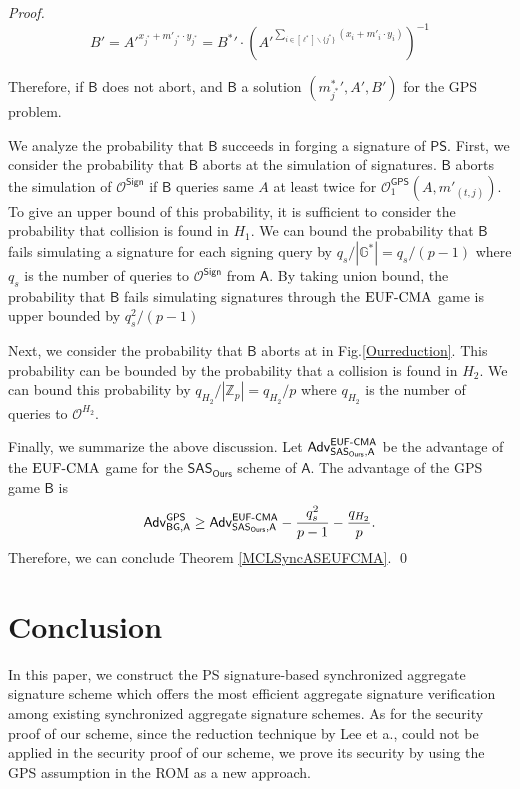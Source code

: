 \documentclass[a4paper,11pt]{fullverllncs}
\newcommand{\A}{\mathsf{A}}
\newcommand{\B}{\mathsf{B}}
\newcommand{\Adv}{\mathsf{Adv}}
\newcommand{\Z}{\mathbb{Z}}
\newcommand{\G}{\mathbb{G}}
\newcommand{\BG}{\mathsf{BG}}
\newcommand{\Ours}{\mathsf{Ours}}
\newcommand{\Sign}{\mathsf{Sign}}
\newcommand{\EUFCMA}{\mathsf{EUF \mathchar`- CMA}}
\newcommand{\rmEUFCMA}{\mathrm{EUF}\mathchar`-\mathrm{CMA}}
\newcommand{\PS}{\mathsf{PS}}
\newcommand{\GPS}{\mathsf{GPS}}
\newcommand{\SAS}{\mathsf{SAS}}
\begin{document}
\begin{proof}
\begin{equation*}
B' =  A'{}^{x_{j^*} + m'_{j^*} \cdot y_{j^*}}  = B^*{}' \cdot \left(A'{}^{\sum_{i \in [\ell^*]\backslash \{j^*\}} (x_i + m'_{i} \cdot y_{i})} \right)^{-1}
\end{equation*}

Therefore, if $\B$ does not abort,  and $\B$ a solution $(m^*_{j^*}{}', A'{}, B' )$ for the GPS problem.



We analyze the probability that $\B$ succeeds in forging a signature of $\PS$.
First, we consider the probability that $\B$ aborts at the simulation of signatures.
$\B$ aborts the simulation of $\mathcal{O^{\Sign}}$ if $\B$ queries same $A$ at least twice for $\mathcal{O}^{\GPS}_{1} (A, m'_{(t,j)})$.
To give an upper bound of this probability, it is sufficient to consider the probability that collision is found in $H_1$.
We can bound the probability that $\B$ fails simulating a signature for each signing query by $q_s/|\G^*| = q_s/(p-1)$ where $q_s$ is the number of queries to $\mathcal{O^{\Sign}}$ from $\A$.
By taking union bound, the probability that $\B$  fails simulating signatures through the $\rmEUFCMA$  game is upper bounded by $q_s^2/(p-1)$

Next, we consider the probability that $\B$ aborts at   in Fig.\ref{Ourreduction}.
This probability can be bounded by the probability that a collision is found in $H_2$.
We can bound this probability by $q_{H_2}/|\Z_p| = q_{H_2}/p$ where $q_{H_2}$ is the number of queries to $\mathcal{O}^{H_2}$. 

Finally, we summarize the above discussion.
Let $\Adv^{\EUFCMA}_{\SAS_{\Ours}, \A}$ be the advantage of the $\rmEUFCMA$ game for the $\SAS_{\Ours}$ scheme of $\A$.
The advantage of the GPS game $\B$ is 
\begin{equation*}
\Adv^{\GPS}_{\BG, \A} \geq \Adv^{\EUFCMA}_{\SAS_{\Ours}, \A}  - \frac{q_s^2}{p-1} - \frac{q_{H_2}}{p}.  
\end{equation*}
Therefore, we can conclude Theorem \ref{MCLSyncASEUFCMA}.
\qed
\end{proof}


\section{Conclusion}
In this paper, we construct the PS signature-based synchronized aggregate signature scheme which offers the most efficient aggregate signature verification among existing synchronized aggregate signature schemes.
As for the security proof of our scheme, since the reduction technique by Lee et a., \cite{LLY13} could not be applied in the security proof of our scheme, we prove its security by using the GPS assumption in the ROM as a new approach.
\end{document}
